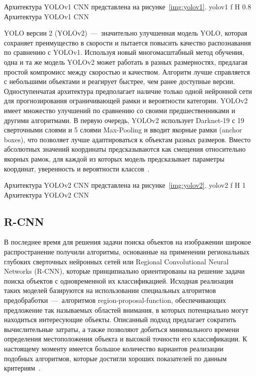 Архитектура YOLOv1 CNN представлена на рисунке~\ref{img:yolov1}.
	{yolov1}
	{f}
	{H}
	{0.8\textwidth}
	{Архитектура YOLOv1 CNN}

YOLO версии 2 (YOLOv2)~---~значительно улучшенная модель YOLO, которая сохраняет преимущество в скорости и пытается повысить качество распознавания по сравнению с YOLOv1.
Используя новый многомасштабный метод обучения, одна и та же модель YOLOv2 может работать в разных размерностях, предлагая простой компромисс между скоростью и качеством.
Алгоритм лучше справляется с небольшими объектами и реагирует быстрее, чем ранее доступные версии.
Одноступенчатая архитектура предполагает наличие только одной нейронной сети для прогнозирования ограничивающей рамки и вероятности категории.
YOLOv2 имеет множество улучшений по сравнению со своими предшественниками и другими алгоритмами.
В первую очередь, YOLOv2 использует Darknet-19 с 19 сверточными слоями и 5 слоями Max-Pooling и вводит якорные рамки (anchor boxes), что позволяет лучше адаптироваться к объектам разных размеров.
Вместо абсолютных значений координаты предсказываются как смещения относительно якорных рамок, для каждой из которых модель предсказывает параметры координат, уверенность и вероятности классов~\cite{yolochina, yolobase}.

\clearpage
Архитектура YOLOv2 CNN представлена на рисунке~\ref{img:yolov2}.
	{yolov2}
	{f}
	{H}
	{1\textwidth}
	{Архитектура YOLOv2 CNN}

\subsection{R-CNN}

В последнее время для решения задачи поиска объектов на изображении широкое распространение получили алгоритмы, основанные на применении региональных глубоких сверточных нейронных сетей или Regional Convolutional Neural Networks (R-CNN), которые принципиально ориентированы на решение задачи поиска объектов с одновременной их классификацией.
Исходная реализация таких моделей базируются на использовании специальных алгоритмов предобработки~---~алгоритмов region-proposal-function, обеспечивающих предложение так называемых областей внимания, в которых потенциально могут находиться интересующие объекты.
Описанный подход предлагает сократить вычислительные затраты, а также позволяют добиться минимального времени определения местоположения объекта и высокой точности его классификации.
К настоящему моменту имеется большое количество вариантов реализации подобных алгоритмов, которые достигли хороших показателей по данным критериям~\cite{rcnn}.

